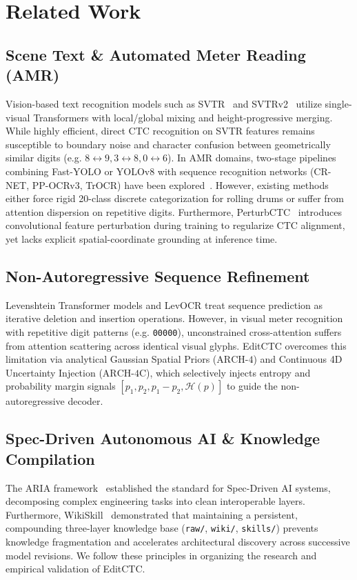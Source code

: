 \section{Related Work}
\label{sec:related}

\subsection{Scene Text \& Automated Meter Reading (AMR)}
Vision-based text recognition models such as SVTR~\cite{du2022svtr} and SVTRv2~\cite{svtrv22025} utilize single-visual Transformers with local/global mixing and height-progressive merging. While highly efficient, direct CTC recognition on SVTR features remains susceptible to boundary noise and character confusion between geometrically similar digits (e.g. $8 \leftrightarrow 9, 3 \leftrightarrow 8, 0 \leftrightarrow 6$). In AMR domains, two-stage pipelines combining Fast-YOLO or YOLOv8 with sequence recognition networks (CR-NET, PP-OCRv3, TrOCR) have been explored~\cite{laroca2020amr}. However, existing methods either force rigid 20-class discrete categorization for rolling drums or suffer from attention dispersion on repetitive digits. Furthermore, PerturbCTC~\cite{perturbctc2026} introduces convolutional feature perturbation during training to regularize CTC alignment, yet lacks explicit spatial-coordinate grounding at inference time.

\subsection{Non-Autoregressive Sequence Refinement}
Levenshtein Transformer models and LevOCR treat sequence prediction as iterative deletion and insertion operations. However, in visual meter recognition with repetitive digit patterns (e.g. \texttt{00000}), unconstrained cross-attention suffers from attention scattering across identical visual glyphs. EditCTC overcomes this limitation via analytical Gaussian Spatial Priors ($\text{ARCH-4}$) and Continuous 4D Uncertainty Injection ($\text{ARCH-4C}$), which selectively injects entropy and probability margin signals $[p_1, p_2, p_1-p_2, \mathcal{H}(p)]$ to guide the non-autoregressive decoder.

\subsection{Spec-Driven Autonomous AI \& Knowledge Compilation}
The ARIA framework~\cite{chen2025spec} established the standard for Spec-Driven AI systems, decomposing complex engineering tasks into clean interoperable layers. Furthermore, WikiSkill~\cite{wikiskill2026} demonstrated that maintaining a persistent, compounding three-layer knowledge base (\texttt{raw/}, \texttt{wiki/}, \texttt{skills/}) prevents knowledge fragmentation and accelerates architectural discovery across successive model revisions. We follow these principles in organizing the research and empirical validation of EditCTC.
